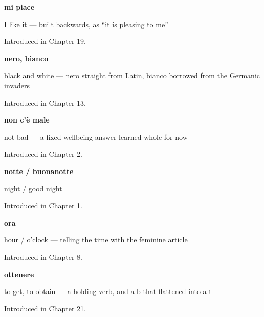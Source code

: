 \noindent\begin{minipage}[t]{\linewidth}
\raggedright
\textbf{mi piace}\par
\small I like it — built backwards, as \textquotedblleft{}it is pleasing to me\textquotedblright{}\par
\footnotesize Introduced in Chapter 19.
\end{minipage}\par\medskip

\noindent\begin{minipage}[t]{\linewidth}
\raggedright
\textbf{nero, bianco}\par
\small black and white — nero straight from Latin, bianco borrowed from the Germanic invaders\par
\footnotesize Introduced in Chapter 13.
\end{minipage}\par\medskip

\noindent\begin{minipage}[t]{\linewidth}
\raggedright
\textbf{non c'è male}\par
\small not bad — a fixed wellbeing answer learned whole for now\par
\footnotesize Introduced in Chapter 2.
\end{minipage}\par\medskip

\noindent\begin{minipage}[t]{\linewidth}
\raggedright
\textbf{notte / buonanotte}\par
\small night / good night\par
\footnotesize Introduced in Chapter 1.
\end{minipage}\par\medskip

\noindent\begin{minipage}[t]{\linewidth}
\raggedright
\textbf{ora}\par
\small hour / o'clock — telling the time with the feminine article\par
\footnotesize Introduced in Chapter 8.
\end{minipage}\par\medskip

\noindent\begin{minipage}[t]{\linewidth}
\raggedright
\textbf{ottenere}\par
\small to get, to obtain — a holding-verb, and a b that flattened into a t\par
\footnotesize Introduced in Chapter 21.
\end{minipage}\par\medskip

